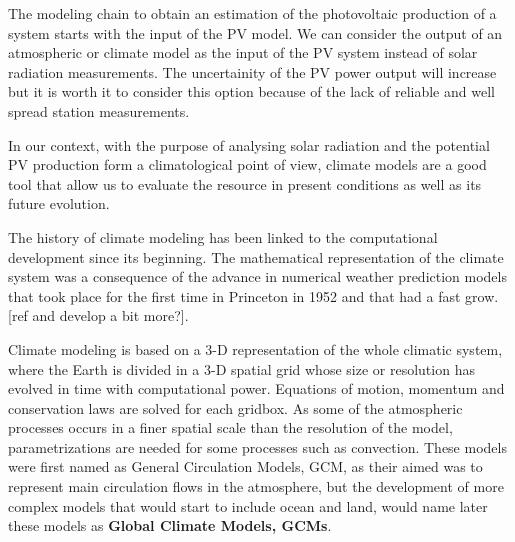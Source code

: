 The modeling chain to obtain an estimation of the photovoltaic production of a system starts with the input of the PV model. We can consider the output of an atmospheric or climate model as the input of the PV system instead of solar radiation measurements. The uncertainity of the PV power output will increase but it is worth it to consider this option because of the lack of reliable and well spread station measurements.
 

In our context, with the purpose of analysing solar radiation and the potential PV production form a climatological point of view, climate models are a good tool that allow us to evaluate the resource in present conditions as well as its future evolution.

The history of climate modeling has been linked to the computational development since its beginning. The mathematical representation of the climate system was a consequence of the advance in numerical weather prediction models that took place for the first time in Princeton in 1952 and that had a fast grow. [ref and {\color{red}develop a bit more?}].

Climate modeling is based on a 3-D representation of the whole climatic system, where the Earth is divided  in a 3-D spatial grid whose size or resolution has evolved in time with computational power. Equations of motion, momentum and conservation laws are solved for each gridbox. As some of the atmospheric processes occurs in a finer spatial scale than the resolution of the model, parametrizations are needed for some processes such as convection. These models were first named as General Circulation Models, GCM, as their aimed was to represent main circulation flows in the atmosphere, but the development of more complex models that would start to include ocean and land, would name later these models as \textbf{Global Climate Models, GCMs}. 

